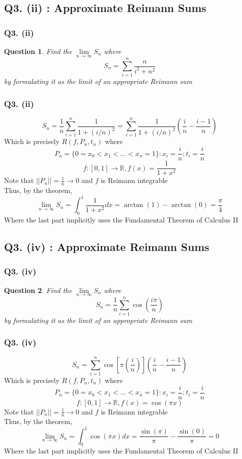 \documentclass[aspectratio=169]{beamer}
\newtheorem{qsn}{Question}
\newcommand{\bR}{\mathbb{R}}
\begin{document}
\subsection{Q3. (ii) : Approximate Reimann Sums}

\begin{frame}
\frametitle{Q3. (ii)}
\pause
\begin{qsn}
Find the $\lim\limits_{n\to\infty} S_n$ where 
$$S_n = \sum\limits_{i=1}^n \frac{n}{i^2+n^2}$$
by formulating it as the limit of an appropriate Reimann sum
\end{qsn}
\end{frame}

\begin{frame}
\frametitle{Q3. (ii)}
\pause
$$S_n = \frac{1}{n} \sum\limits_{i=1}^n \frac{1}{1+(i/n)^2} = \sum\limits_{i=1}^n \frac{1}{1+(i/n)^2}\left(\frac{i}{n}-\frac{i-1}{n}\right)$$ \pause
Which is precisely $R(f,P_n,t_n)$ where \pause
$$P_n = \{0=x_0<x_1<\dots<x_n=1\} : x_i = \frac{i}{n};t_i = \frac{i}{n}$$ \pause
$$f:[0,1]\to \bR, f(x) = \frac{1}{1+x^2}$$ \pause
Note that $||P_n|| = \frac{1}{n} \to 0$ and $f$ is Reimann integrable \\ \pause
Thus, by the theorem, $$\lim\limits_{n\to\infty} S_n = \int_0^1 \frac{1}{1+x^2}dx = \arctan(1)-\arctan(0) = \frac{\pi}{4}$$ \pause
Where the last part implicitly uses the Fundamental Theorem of Calculus II
\end{frame}

\subsection{Q3. (iv) : Approximate Reimann Sums}

\begin{frame}
\frametitle{Q3. (iv)}
\pause
\begin{qsn}
Find the $\lim\limits_{n\to\infty} S_n$ where 
$$S_n = \frac{1}{n}\sum\limits_{i=1}^n \cos\left(\frac{i\pi}{n}\right)$$
by formulating it as the limit of an appropriate Reimann sum
\end{qsn}
\end{frame}

\begin{frame}
\frametitle{Q3. (iv)}
\pause
$$S_n = \sum\limits_{i=1}^n \cos\left[\pi\left(\frac{i}{n}\right)\right] \left(\frac{i}{n}-\frac{i-1}{n}\right)$$ \pause
Which is precisely $R(f,P_n,t_n)$ where \pause
$$P_n = \{0=x_0<x_1<\dots<x_n=1\} : x_i = \frac{i}{n};t_i = \frac{i}{n}$$ \pause
$$f:[0,1]\to \bR, f(x) = \cos(\pi x)$$ \pause
Note that $||P_n|| = \frac{1}{n} \to 0$ and $f$ is Reimann integrable \\ \pause
Thus, by the theorem, $$\lim\limits_{n\to\infty} S_n = \int_0^1 \cos(\pi x) dx = \frac{\sin(\pi)}{\pi} - \frac{\sin(0)}{\pi} = 0$$ \pause
Where the last part implicitly uses the Fundamental Theorem of Calculus II
\end{frame}
\end{document}
